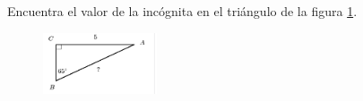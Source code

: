 Encuentra el valor de la incógnita en el triángulo de la figura \ref{fig:lados_functrig_07}.
\begin{figure}[H]
    \begin{center}
        \includegraphics[width=0.3\textwidth]{../images/lados_functrig_07.png}
    \end{center}
    \caption{}
    \label{fig:lados_functrig_07}
\end{figure}
